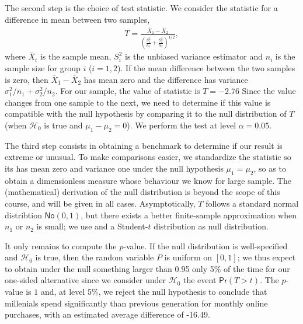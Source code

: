 \documentclass[
  11pt,
  letterpaper,
]{book}
\theoremstyle{definition}
\theoremstyle{definition}
\theoremstyle{definition}
\theoremstyle{remark}
\begin{document}
The second step is the choice of test statistic. We consider the \citet{Welch:1947} statistic for a difference in mean between two samples,
\begin{align*}
T = \frac{\overline{X}_1 - \overline{X}_2}{\left(\frac{S_1^2}{n_1}+\frac{S_2^2}{n_2} \right)^{1/2}}, \end{align*}
where \(\overline{X}_i\) is the sample mean, \(S_i^2\) is the unbiased variance estimator and \(n_i\) is the sample size for group \(i\) (\(i=1, 2\)). If the mean difference between the two samples is zero, then \(\overline{X}_1-\overline{X}_2\) has mean zero and the difference has variance \(\sigma^2_1/n_1+\sigma^2_2/n_2\). For our sample, the value of statistic is \(T=-2.76\) Since the value changes from one sample to the next, we need to determine if this value is compatible with the null hypothesis by comparing it to the null distribution of \(T\) (when \(\mathscr{H}_0\) is true and \(\mu_1-\mu_2=0\)). We perform the test at level \(\alpha=0.05\).

The third step consists in obtaining a benchmark to determine if our result is extreme or unusual. To make comparisons easier, we standardize the statistic so its has mean zero and variance one under the null hypothesis \(\mu_1=\mu_2\), so as to obtain a dimensionless measure whose behaviour we know for large sample. The (mathematical) derivation of the null distribution is beyond the scope of this course, and will be given in all cases. Asymptotically, \(T\) follows a standard normal distribtion \(\mathsf{No}(0, 1)\), but there exists a better finite-sample approximation when \(n_1\) or \(n_2\) is small; we use \citet{Satterthwaite:1946} and a Student-\(t\) distribution as null distribution.

It only remains to compute the \emph{p}-value. If the null distribution is well-specified and \(\mathscr{H}_0\) is true, then the random variable \(P\) is uniform on \([0, 1]\); we thus expect to obtain under the null something larger than 0.95 only 5\% of the time for our one-sided alternative since we consider under \(\mathscr{H}_0\) the event \(\mathsf{Pr}(T > t)\). The \(p\)-value is \(1\) and, at level 5\%, we reject the null hypothesis to conclude that millenials spend significantly than previous generation for monthly online purchases, with an estimated average difference of -16.49.
\end{document}
